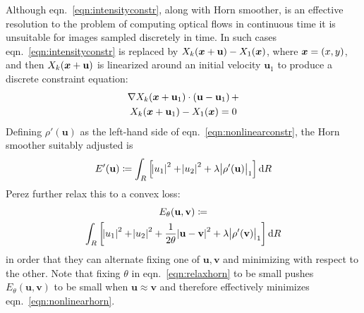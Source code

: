 Although eqn.~\eqref{eqn:intensityconstr}, along with Horn smoother, is an effective resolution to the problem of computing optical flows in continuous time it is unsuitable for images sampled discretely in time.
%
In such cases eqn.~\eqref{eqn:intensityconstr} is replaced by \( X_k(\bm{x} + \mathbf{u}) - X_1(\bm{x})\), where \(\bm{x} = (x,y)\), and then \( X_k(\bm{x} + \mathbf{u})\) is  linearized around an initial velocity \(\mathbf{u}_1\) to produce a discrete constraint equation:
\begin{multline}
	\nabla X_k (\bm{x} + \mathbf{u}_1)\cdot (\mathbf{u} - \mathbf{u}_1)\, + \\ X_k(\bm{x} + \mathbf{u}_1)  -  X_1(\bm{x}) = 0
	\label{eqn:nonlinearconstr}
\end{multline}
Defining \(\rho'(\mathbf{u})\) as the left-hand side of eqn.~\eqref{eqn:nonlinearconstr}, the Horn smoother suitably adjusted is
\begin{equation}
	E'(\mathbf{u}) \coloneqq \int_R \left[ \abs{ u_1 }^2 + \abs{ u_2 }^2 + \lambda \abs{ \rho'(\mathbf{u}) }_1 \right] \dif R
	\label{eqn:nonlinearhorn}
\end{equation}
%
Perez \etal \cite{perez2013tv} further relax this to a convex loss:
\begin{multline}
	E_{\theta}(\mathbf{u}, \mathbf{v}) \coloneqq \\
	\int_R \left[ \abs{ u_1 }^2 + \abs{ u_2 }^2 + \frac{1}{2\theta}\abs{ \mathbf{u} - \mathbf{v} }^2 + \lambda \abs{ \rho'(\mathbf{v}) }_1 \right] \dif R
	\label{eqn:relaxhorn}
\end{multline}
in order that they can alternate fixing one of \(\mathbf{u}, \mathbf{v}\) and minimizing with respect to the other.
%
Note that fixing \(\theta\) in eqn.~\eqref{eqn:relaxhorn} to be small pushes \(E_{\theta}(\mathbf{u}, \mathbf{v})\) to be small when \(\mathbf{u}\approx \mathbf{v}\) and therefore effectively minimizes eqn.~\eqref{eqn:nonlinearhorn}.
